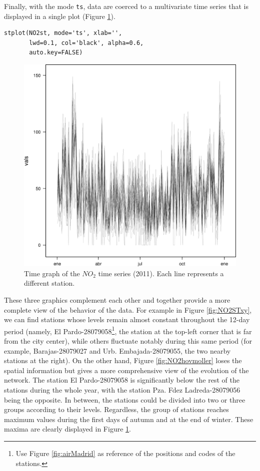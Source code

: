 Finally, with the mode \texttt{ts}, data are coerced to a multivariate time series
that is displayed in a single plot (Figure \ref{fig:NO2zoo}).

\lstset{language=R,numbers=none}
\begin{lstlisting}
stplot(NO2st, mode='ts', xlab='',
       lwd=0.1, col='black', alpha=0.6,
       auto.key=FALSE)
\end{lstlisting}

\begin{figure}[htb]
\centering
\includegraphics[width=.9\linewidth]{figs/NO2zoo.png}
\caption{\label{fig:NO2zoo}Time graph of the $NO_2$ time series (2011). Each line represents a different station.}
\end{figure}

These three graphics complement each other and together provide a more
complete view of the behavior of the data. For example in Figure
\ref{fig:NO2STxy}, we can find stations whose levels remain almost constant
throughout the 12-day period (namely, El Pardo-28079058\footnote{Use Figure \ref{fig:airMadrid} as reference of the
positions and codes of the stations.}, the
station at the top-left corner that is far from the city center),
while others fluctuate notably during this same period (for example,
Barajas-28079027 and Urb. Embajada-28079055, the two nearby stations
at the right). On the other hand, Figure \ref{fig:NO2hovmoller} loses the
spatial information but gives a more comprehensive view of the
evolution of the network. The station El Pardo-28079058 is
significantly below the rest of the stations during the whole year,
with the station Pza. Fdez Ladreda-28079056 being the opposite. In
between, the stations could be divided into two or three groups
according to their levels. Regardless, the group of stations reaches
maximum values during the first days of autumn and at the end of
winter. These maxima are clearly displayed in Figure \ref{fig:NO2zoo}.

